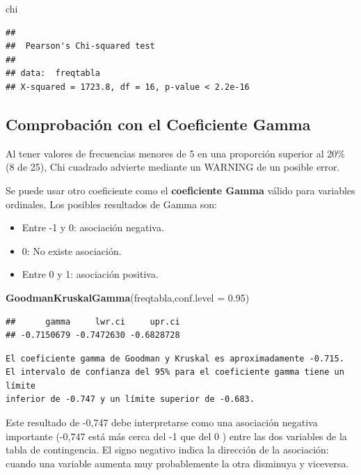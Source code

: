 \documentclass[
  12 pt,
  a4paper,
]{article}
\newenvironment{Shaded}{\begin{snugshade}}{\end{snugshade}}
\newcommand{\AttributeTok}[1]{\textcolor[rgb]{0.13,0.29,0.53}{#1}}
\newcommand{\FloatTok}[1]{\textcolor[rgb]{0.00,0.00,0.81}{#1}}
\newcommand{\FunctionTok}[1]{\textcolor[rgb]{0.13,0.29,0.53}{\textbf{#1}}}
\newcommand{\NormalTok}[1]{#1}
\providecommand{\tightlist}{%
  \setlength{\itemsep}{0pt}\setlength{\parskip}{0pt}}
\begin{document}
\begin{Shaded}
\begin{Highlighting}[]
\NormalTok{chi}
\end{Highlighting}
\end{Shaded}

\begin{verbatim}
## 
##  Pearson's Chi-squared test
## 
## data:  freqtabla
## X-squared = 1723.8, df = 16, p-value < 2.2e-16
\end{verbatim}

\subsection{Comprobación con el Coeficiente
Gamma}\label{comprobaciuxf3n-con-el-coeficiente-gamma}

Al tener valores de frecuencias menores de 5 en una proporción superior
al 20\% (8 de 25), Chi cuadrado advierte mediante un WARNING de un
posible error.

Se puede usar otro coeficiente como el \textbf{coeficiente Gamma} válido
para variables ordinales. Los posibles resultados de Gamma son:

\begin{itemize}
\tightlist
\item
  Entre -1 y 0: asociación negativa.
\item
  0: No existe asociación.
\item
  Entre 0 y 1: asociación positiva.
\end{itemize}

\begin{Shaded}
\begin{Highlighting}[]
\FunctionTok{GoodmanKruskalGamma}\NormalTok{(freqtabla,}\AttributeTok{conf.level =} \FloatTok{0.95}\NormalTok{)}
\end{Highlighting}
\end{Shaded}

\begin{verbatim}
##      gamma     lwr.ci     upr.ci 
## -0.7150679 -0.7472630 -0.6828728
\end{verbatim}

\begin{verbatim}
El coeficiente gamma de Goodman y Kruskal es aproximadamente -0.715.
El intervalo de confianza del 95% para el coeficiente gamma tiene un límite 
inferior de -0.747 y un límite superior de -0.683.
\end{verbatim}

Este resultado de -0,747 debe interpretarse como una asociación negativa
importante (-0,747 está más cerca del -1 que del 0 ) entre las dos
variables de la tabla de contingencia. El signo negativo indica la
dirección de la asociación: cuando una variable aumenta muy
probablemente la otra disminuya y viceversa.
\end{document}
